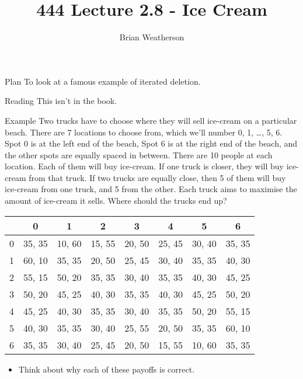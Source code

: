 \documentclass[
  ignorenonframetext,
]{beamer}
\title{444 Lecture 2.8 - Ice Cream}
\author{Brian Weatherson}
\date{}
\providecommand{\tightlist}{%
  \setlength{\itemsep}{0pt}\setlength{\parskip}{0pt}}
\begin{document}
\frame{\titlepage}

\begin{frame}{Plan}
\protect\hypertarget{plan}{}
To look at a famous example of iterated deletion.
\end{frame}

\begin{frame}{Reading}
\protect\hypertarget{reading}{}
This isn't in the book.
\end{frame}

\begin{frame}{Example}
\protect\hypertarget{example}{}
Two trucks have to choose where they will sell ice-cream on a particular
beach. There are 7 locations to choose from, which we'll number 0, 1,
\ldots, 5, 6. Spot 0 is at the left end of the beach, Spot 6 is at the
right end of the beach, and the other spots are equally spaced in
between. There are 10 people at each location. Each of them will buy
ice-cream. If one truck is closer, they will buy ice-cream from that
truck. If two trucks are equally close, then 5 of them will buy
ice-cream from one truck, and 5 from the other. Each truck aims to
maximise the amount of ice-cream it sells. Where should the trucks end
up?
\end{frame}

\begin{frame}
\begin{table}[!h]
\centering
\begin{tabular}[t]{>{}r|ccccccc}
\toprule
 & 0 & 1 & 2 & 3 & 4 & 5 & 6\\
\midrule
0 & 35, 35 & 10, 60 & 15, 55 & 20, 50 & 25, 45 & 30, 40 & 35, 35\\
1 & 60, 10 & 35, 35 & 20, 50 & 25, 45 & 30, 40 & 35, 35 & 40, 30\\
2 & 55, 15 & 50, 20 & 35, 35 & 30, 40 & 35, 35 & 40, 30 & 45, 25\\
3 & 50, 20 & 45, 25 & 40, 30 & 35, 35 & 40, 30 & 45, 25 & 50, 20\\
4 & 45, 25 & 40, 30 & 35, 35 & 30, 40 & 35, 35 & 50, 20 & 55, 15\\
5 & 40, 30 & 35, 35 & 30, 40 & 25, 55 & 20, 50 & 35, 35 & 60, 10\\
6 & 35, 35 & 30, 40 & 25, 45 & 20, 50 & 15, 55 & 10, 60 & 35, 35\\
\bottomrule
\end{tabular}
\end{table}

\begin{itemize}
\tightlist
\item
  Think about why each of these payoffs is correct.
\end{itemize}
\end{frame}
\end{document}

